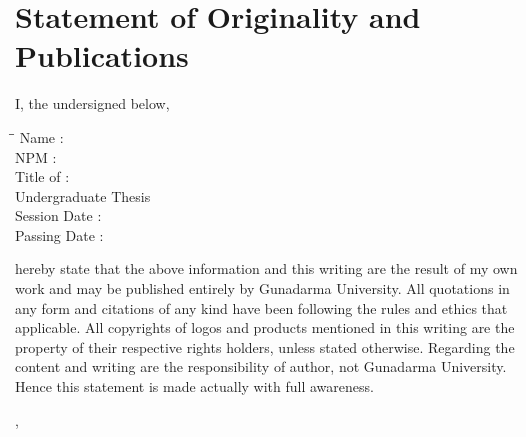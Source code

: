 
\begingroup
\let\clearpage\relax
\let\cleardoublepage\relax

\chapter*{Statement of Originality and Publications}
\label{chap:sig-statement}

I, the undersigned below,

\begin{tabbing}
\hspace*{4.2cm}\=\hspace*{0.5cm}\= \kill
Name \>:\> \myName \\
NPM \>:\> \myNPM \\
Title of \>:\> \myTitleLineOne \\
Undergraduate Thesis \>\> \myTitleLineTwo \\
Session Date \>:\> \myDateSession \\
Passing Date \>:\> \textcolor{white}{\myDatePassing} %
\end{tabbing}

hereby state that the above information and this writing are the result of my own work and may be published entirely by Gunadarma University.
All quotations in any form and citations of any kind have been following the rules and ethics that applicable.
All copyrights of logos and products mentioned in this writing are the property of their respective rights holders, unless stated otherwise.
Regarding the content and writing are the responsibility of author, not Gunadarma University.
Hence this statement is made actually with full awareness.

\hfill

\begin{flushright}
\myCity, \myDateSession
\end{flushright}

\hfill

\begin{flushright}
\myName
\end{flushright}

\endgroup
